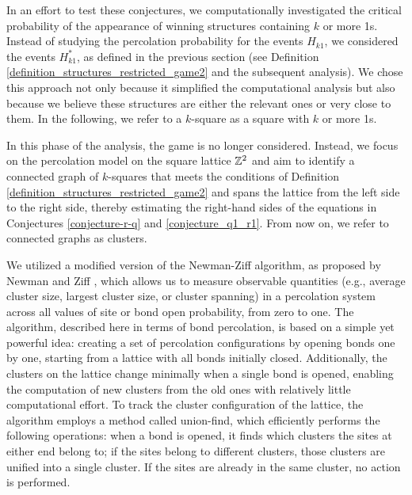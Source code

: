         In an effort to test these conjectures, we computationally investigated the critical probability of the appearance of winning structures containing $k$ or more 1s. Instead of studying the percolation probability for the events $H_{k1}$, we considered the events $H_{k1}^*$, as defined in the previous section (see Definition \ref{definition_structures_restricted_game2} and the subsequent analysis). We chose this approach not only because it simplified the computational analysis but also because we believe these structures are either the relevant ones or very close to them. In the following, we refer to a $k$-square as a square with $k$ or more 1s.

        In this phase of the analysis, the game is no longer considered. Instead, we focus on the percolation model on the square lattice $\mathbb{Z}^2$ and aim to identify a connected graph of $k$-squares that meets the conditions of Definition \ref{definition_structures_restricted_game2} and spans the lattice from the left side to the right side, thereby estimating the right-hand sides of the equations in Conjectures \ref{conjecture-r-q} and \ref{conjecture_q1_r1}. From now on, we refer to connected graphs as clusters.

        We utilized a modified version of the Newman-Ziff algorithm, as proposed by Newman and Ziff \cite{NewmanZiff2001}, which allows us to measure observable quantities (e.g., average cluster size, largest cluster size, or cluster spanning) in a percolation system across all values of site or bond open probability, from zero to one. The algorithm, described here in terms of bond percolation, is based on a simple yet powerful idea: creating a set of percolation configurations by opening bonds one by one, starting from a lattice with all bonds initially closed. Additionally, the clusters on the lattice change minimally when a single bond is opened, enabling the computation of new clusters from the old ones with relatively little computational effort. To track the cluster configuration of the lattice, the algorithm employs a method called union-find, which efficiently performs the following operations: when a bond is opened, it finds which clusters the sites at either end belong to; if the sites belong to different clusters, those clusters are unified into a single cluster. If the sites are already in the same cluster, no action is performed.

